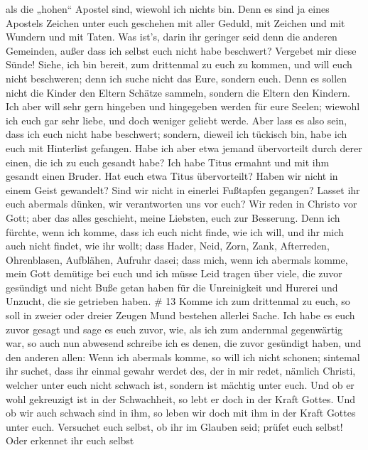 als die „hohen`` Apostel sind, wiewohl ich nichts bin. 
Denn es sind ja eines Apostels Zeichen unter euch geschehen mit aller
Geduld, mit Zeichen und mit Wundern und mit Taten.  Was
ist's, darin ihr geringer seid denn die anderen Gemeinden, außer dass
ich selbst euch nicht habe beschwert? Vergebet mir diese Sünde!
 Siehe, ich bin bereit, zum drittenmal zu euch zu kommen,
und will euch nicht beschweren; denn ich suche nicht das Eure, sondern
euch. Denn es sollen nicht die Kinder den Eltern Schätze sammeln,
sondern die Eltern den Kindern.  Ich aber will sehr gern
hingeben und hingegeben werden für eure Seelen; wiewohl ich euch gar
sehr liebe, und doch weniger geliebt werde.  Aber lass es
also sein, dass ich euch nicht habe beschwert; sondern, dieweil ich
tückisch bin, habe ich euch mit Hinterlist gefangen.  Habe
ich aber etwa jemand übervorteilt durch derer einen, die ich zu euch
gesandt habe?  Ich habe Titus ermahnt und mit ihm gesandt
einen Bruder. Hat euch etwa Titus übervorteilt? Haben wir nicht in einem
Geist gewandelt? Sind wir nicht in einerlei Fußtapfen gegangen?
 Lasset ihr euch abermals dünken, wir verantworten uns vor
euch? Wir reden in Christo vor Gott; aber das alles geschieht, meine
Liebsten, euch zur Besserung.  Denn ich fürchte, wenn ich
komme, dass ich euch nicht finde, wie ich will, und ihr mich auch nicht
findet, wie ihr wollt; dass Hader, Neid, Zorn, Zank, Afterreden,
Ohrenblasen, Aufblähen, Aufruhr dasei;  dass mich, wenn ich
abermals komme, mein Gott demütige bei euch und ich müsse Leid tragen
über viele, die zuvor gesündigt und nicht Buße getan haben für die
Unreinigkeit und Hurerei und Unzucht, die sie getrieben haben. \# 13
 Komme ich zum drittenmal zu euch, so soll in zweier oder
dreier Zeugen Mund bestehen allerlei Sache.  Ich habe es
euch zuvor gesagt und sage es euch zuvor, wie, als ich zum andernmal
gegenwärtig war, so auch nun abwesend schreibe ich es denen, die zuvor
gesündigt haben, und den anderen allen: Wenn ich abermals komme, so will
ich nicht schonen;  sintemal ihr suchet, dass ihr einmal
gewahr werdet des, der in mir redet, nämlich Christi, welcher unter euch
nicht schwach ist, sondern ist mächtig unter euch.  Und ob
er wohl gekreuzigt ist in der Schwachheit, so lebt er doch in der Kraft
Gottes. Und ob wir auch schwach sind in ihm, so leben wir doch mit ihm
in der Kraft Gottes unter euch.  Versuchet euch selbst, ob
ihr im Glauben seid; prüfet euch selbst! Oder erkennet ihr euch selbst
